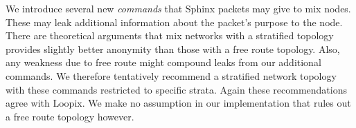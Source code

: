 We introduce several new {\em commands} that Sphinx packets may give
to mix nodes.  These may leak additional information about the
packet's purpose to the node.  There are theoretical arguments that 
mix networks with a stratified topology provides slightly better
anonymity than those with a free route topology.  
Also, any weakness due to free route might compound leaks from our
additional commands.  We therefore tentatively recommend a stratified
network topology with these commands restricted to specific strata.  
Again these recommendations agree with Loopix.  We make no assumption
in our implementation that rules out a free route topology however.  



